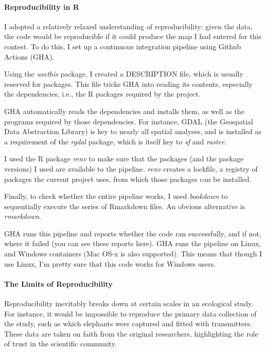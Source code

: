 	\paragraph*{Reproducibility in R}

	I adopted a relatively relaxed understanding of reproducibility: given the data, the code would be reproducible if it could produce the map I had entered for this contest. To do this, I set up a continuous integration pipeline using Github Actions (GHA).

	Using the \textit{usethis} package, I created a DESCRIPTION file, which is usually reserved for packages. This file tricks GHA into reading its contents, especially the dependencies, i.e., the R packages required by the project.

	GHA automatically reads the dependencies and installs them, as well as the programs required by those dependencies. For instance, GDAL (the Geospatial Data Abstraction Library) is key to nearly all spatial analyses, and is installed as a requirement of the \textit{rgdal} package, which is itself key to \textit{sf} and \textit{raster}.

	I used the R package \textit{renv} to make sure that the packages (and the package versions) I used are available to the pipeline. \textit{renv} creates a lockfile, a registry of packages the current project uses, from which those packages can be installed.

	Finally, to check whether the entire pipeline works, I used \textit{bookdown} to sequentially execute the series of Rmarkdown files. An obvious alternative is \textit{rmarkdown}.

	GHA runs this pipeline and reports whether the code ran successfully, and if not, where it failed (you can see these reports here). GHA runs the pipeline on Linux, and Windows containers (Mac OS-x is also supported). This means that though I use Linux, I'm pretty sure that this code works for Windows users.

	\paragraph*{The Limits of Reproducibility}

	Reproducibility inevitably breaks down at certain scales in an ecological study. For instance, it would be impossible to reproduce the primary data collection of the study, such as which elephants were captured and fitted with transmitters. These data are taken on faith from the original researchers, highlighting the role of trust in the scientific community.

